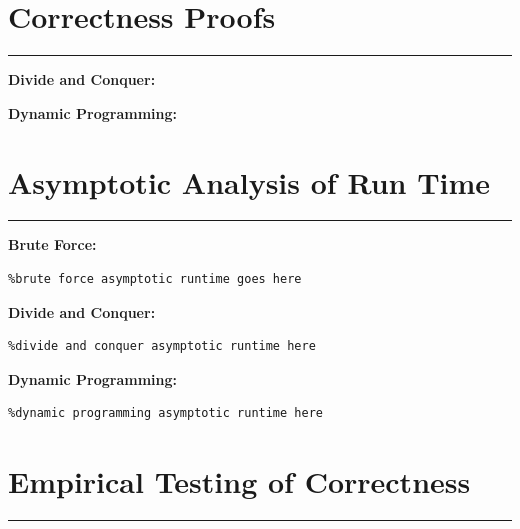 \documentclass[letterpaper,10pt,titlepage,fleqn]{article}
\begin{document}
    \section*{Correctness Proofs}
    \hrule

    \begin{centering}
    \textbf{Divide and Conquer:}
    \end{centering}


    \begin{centering}
    \textbf{Dynamic Programming:}
    \end{centering}








\section*{Asymptotic Analysis of Run Time}
\hrule
\begin{centering}
\textbf{Brute Force:}
\end{centering}

\begin{lstlisting}%brute force asymptotic runtime goes here

\end{lstlisting}

\begin{centering}
\textbf{Divide and Conquer:}
\end{centering}

\begin{lstlisting}%divide and conquer asymptotic runtime here

\end{lstlisting}

\begin{centering}
\textbf{Dynamic Programming:}
\end{centering}

\begin{lstlisting}%dynamic programming asymptotic runtime here

\end{lstlisting}



\section*{Empirical Testing of Correctness}
\hrule
\end{document}
